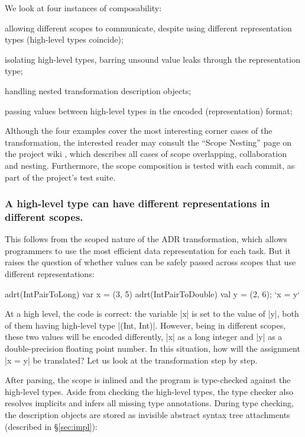 We look at four instances of composability:

\begin{compactitem}
  \item allowing different scopes to communicate, despite using different representation types (high-level types coincide);
  \item isolating high-level types, barring unsound value leaks through the representation type;
  \item handling nested transformation description objects;
  \item passing values between high-level types in the encoded (representation) format;
\end{compactitem}

Although the four examples cover the most interesting corner cases of the transformation, the interested reader may consult the ``Scope Nesting'' page on the project wiki \cite{ildl-plugin-wiki}, which describes all cases of scope overlapping, collaboration and nesting. Furthermore, the scope composition is tested with each commit, as part of the project's test suite.

\subsubsection{A high-level type can have different representations in different scopes.} This follows from the scoped nature of the ADR transformation, which allows programmers to use the most efficient data representation for each task. But it raises the question of whether values can be safely passed across scopes that use different representations:

\begin{lstlisting-nobreak}
adrt(IntPairToLong)   { var x = (3, 5) }
adrt(IntPairToDouble) { val y = (2, 6); `x = y` }
\end{lstlisting-nobreak}

At a high level, the code is correct: the variable |x| is set to the value of |y|, both of them having high-level type |(Int, Int)|. However, being in different scopes, these two values will be encoded differently, |x| as a long integer and |y| as a double-precision floating point number. In this situation, how will the assignment |x = y| be translated? Let us look at the transformation step by step.

After parsing, the scope is inlined and the program is type-checked against the high-level types. Aside from checking the high-level types, the type checker also resolves implicits and infers all missing type annotations. During type checking, the description objects are stored as invisible abstract syntax tree attachments (described in \S\ref{sec:impl}):

